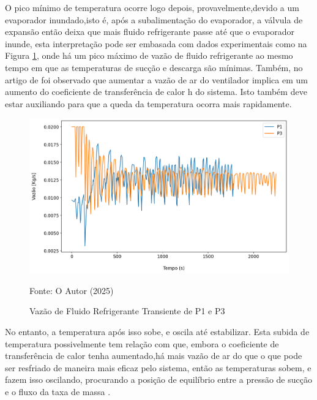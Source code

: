 O pico mínimo de temperatura ocorre logo depois, provavelmente,devido a um evaporador inundado,isto é, após a subalimentação do evaporador, a válvula de expansão então deixa que mais fluido refrigerante passe até que o evaporador inunde, esta interpretação pode ser embasada com dados experimentais como na Figura \ref{fig:VazãodeFluidoPerturbaçãoVentilador}, onde há um pico máximo de vazão de fluido refrigerante ao mesmo tempo em que as temperaturas de sucção e descarga são mínimas. Também, no artigo de \textcite{VaryingFanSpeedCavallaro} foi observado que aumentar a vazão de ar do ventilador implica em um aumento do coeficiente de transferência de calor h do sistema. Isto também deve estar auxiliando para que a queda da temperatura ocorra mais rapidamente.
\newpage
\begin{figure}[h]
    \centering
    \includegraphics[width=1\linewidth]{FigurasdoTexto/VazãodeFluidoPerturbaçãoVentilador.png}
    \caption{Vazão de Fluido Refrigerante Transiente de P1 e P3}
    \label{fig:VazãodeFluidoPerturbaçãoVentilador}
    {\footnotesize Fonte: O Autor (2025)}
\end{figure}

No entanto, a temperatura após isso sobe, e oscila até estabilizar. Esta subida de temperatura possivelmente tem relação com que, embora o coeficiente de transferência de calor tenha aumentado,há mais vazão de ar do que o que pode ser resfriado de maneira mais eficaz pelo sistema, então as temperaturas sobem, e fazem isso oscilando, procurando a posição de equilíbrio entre a pressão de sucção e o fluxo da taxa de massa \cite{StoekerRefrigeration}.  

